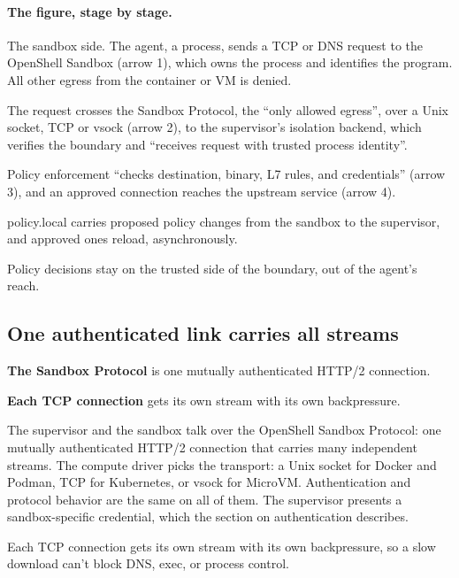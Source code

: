 \paragraph{The figure, stage by stage.}
\be
\item The sandbox side. The agent, a process, sends a TCP or DNS request to the OpenShell Sandbox (arrow 1), which owns the process and identifies the program. All other egress from the container or VM is denied.
\item The request crosses the Sandbox Protocol, the ``only allowed egress'', over a Unix socket, TCP or vsock (arrow 2), to the supervisor's isolation backend, which verifies the boundary and ``receives request with trusted process identity''.
\item Policy enforcement ``checks destination, binary, L7 rules, and credentials'' (arrow 3), and an approved connection reaches the upstream service (arrow 4).
\item policy.local carries proposed policy changes from the sandbox to the supervisor, and approved ones reload, asynchronously.
\ee

\begin{takeaway}Policy decisions stay on the trusted side of the boundary, out of the agent's reach.\end{takeaway}

\subsection{One authenticated link carries all streams}
\label{sec:it-os-2-2}

\bi
\item \textbf{The Sandbox Protocol} is one mutually authenticated HTTP/2 connection.
\item \textbf{Each TCP connection} gets its own stream with its own backpressure.
\ei

The supervisor and the sandbox talk over the OpenShell Sandbox Protocol: one mutually authenticated HTTP/2 connection that carries many independent streams. The compute driver picks the transport: a Unix socket for Docker and Podman, TCP for Kubernetes, or vsock for MicroVM. Authentication and protocol behavior are the same on all of them. The supervisor presents a sandbox-specific credential, which the section on authentication describes.

Each TCP connection gets its own stream with its own backpressure, so a slow download can't block DNS, exec, or process control.

